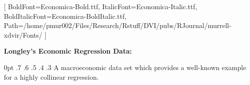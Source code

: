 \documentclass[varwidth]{standalone}
\begin{document}
\setmainfont{Economica-Regular.ttf}[
  BoldFont=Economica-Bold.ttf,
  ItalicFont=Economica-Italic.ttf,
  BoldItalicFont=Economica-BoldItalic.ttf,
  Path=/home/pmur002/Files/Research/Rstuff/DVI/pubs/RJournal/murrell-xdvir/Fonts/ 
]
\fontsize{14}{16}\selectfont
\begin{minipage}{3in}
{\bf Longley's Economic Regression Data:}

0pt .7\textwidth
0pt .6\textwidth
0pt .5\textwidth
0pt .4\textwidth
0pt .3\textwidth
A macroeconomic data set which provides a well-known example for a
highly collinear regression.

\end{minipage}
\end{document}
